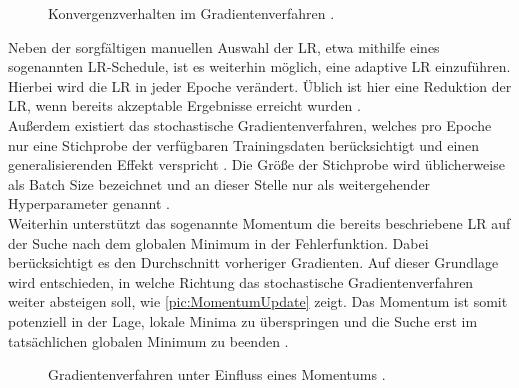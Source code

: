 \begin{figure}[h!]
  \centering
  \caption{Konvergenzverhalten im Gradientenverfahren \cite[S.~429]{ZHA20}.}
  \label{pic:GradientDescent}
\end{figure}

\noindent
Neben der sorgfältigen manuellen Auswahl der \ac{LR}, etwa mithilfe eines sogenannten \ac{LR}-Schedule, ist es weiterhin möglich, eine adaptive \ac{LR} einzuführen. Hierbei wird die \ac{LR} in jeder Epoche verändert. Üblich ist hier eine Reduktion der \ac{LR}, wenn bereits akzeptable Ergebnisse erreicht wurden \cite[S.~433]{ZHA20}.\\

\noindent
Außerdem existiert das stochastische Gradientenverfahren, welches pro Epoche nur eine Stichprobe der verfügbaren Trainingsdaten berücksichtigt und einen generalisierenden Effekt verspricht \cite[S.~437]{ZHA20}. Die Größe der Stichprobe wird üblicherweise als Batch Size bezeichnet und an dieser Stelle nur als weitergehender Hyperparameter genannt \cite[S.~446]{ZHA20}.\\

\noindent
Weiterhin unterstützt das sogenannte Momentum die bereits beschriebene \ac{LR} auf der Suche nach dem globalen Minimum in der Fehlerfunktion. Dabei berücksichtigt es den Durchschnitt vorheriger Gradienten. Auf dieser Grundlage wird entschieden, in welche Richtung das stochastische Gradientenverfahren weiter absteigen soll, wie \autoref{pic:MomentumUpdate} zeigt. Das Momentum ist somit potenziell in der Lage, lokale Minima zu überspringen und die Suche erst im tatsächlichen globalen Minimum zu beenden \cite[S.~453-456]{ZHA20}.\\

\begin{figure}[h!]
  \centering
  \caption{Gradientenverfahren unter Einfluss eines Momentums \cite{CSNOJ}.}
  \label{pic:MomentumUpdate}
\end{figure}

